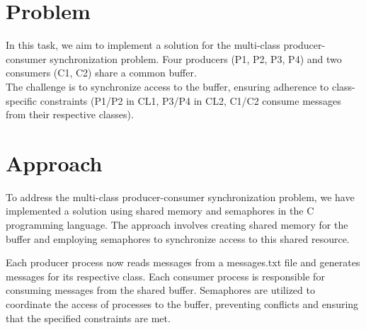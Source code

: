 \section{Problem}
In this task, we aim to implement a solution for the multi-class producer-consumer synchronization problem. Four producers (P1, P2, P3, P4) and two consumers (C1, C2) share a common buffer.\\
The challenge is to synchronize access to the buffer, ensuring adherence to class-specific constraints (P1/P2 in CL1, P3/P4 in CL2, C1/C2 consume messages from their respective classes).

\section{Approach}
To address the multi-class producer-consumer synchronization problem, we have implemented a solution using shared memory and semaphores in the C programming language. The approach involves creating shared memory for the buffer and employing semaphores to synchronize access to this shared resource.

Each producer process now reads messages from a messages.txt file and generates messages for its respective class. Each consumer process is responsible for consuming messages from the shared buffer. Semaphores are utilized to coordinate the access of processes to the buffer, preventing conflicts and ensuring that the specified constraints are met.

